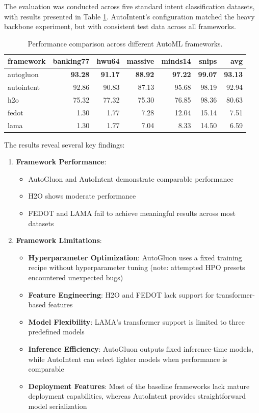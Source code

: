 The evaluation was conducted across five standard intent classification datasets, with results presented in Table \ref{tab:baselines}. AutoIntent's configuration matched the heavy backbone experiment, but with consistent test data across all frameworks.

\begin{table}[h]
\centering
\begin{tabular}{l|rrrrr|r}
\toprule
framework & banking77 & hwu64 & massive & minds14 & snips & avg \\
\midrule
autogluon & \textbf{93.28} & \textbf{91.17} & \textbf{88.92} & \textbf{97.22} & \textbf{99.07} & \textbf{93.13} \\
autointent & 92.86 & 90.83 & 87.13 & 95.68 & 98.19 & 92.94 \\
h2o & 75.32 & 77.32 & 75.30 & 76.85 & 98.36 & 80.63 \\
fedot & 1.30 & 1.77 & 7.28 & 12.04 & 15.14 & 7.51 \\
lama & 1.30 & 1.77 & 7.04 & 8.33 & 14.50 & 6.59 \\
\bottomrule
\end{tabular}
\caption{Performance comparison across different AutoML frameworks.}
\label{tab:baselines}
\end{table}

The results reveal several key findings:

\begin{enumerate}
    \item \textbf{Framework Performance}:
    \begin{itemize}
        \item AutoGluon and AutoIntent demonstrate comparable performance
        \item H2O shows moderate performance
        \item FEDOT and LAMA fail to achieve meaningful results across most datasets
    \end{itemize}
    
    \item \textbf{Framework Limitations}:
    \begin{itemize}
        \item \textbf{Hyperparameter Optimization}: AutoGluon uses a fixed training recipe without hyperparameter tuning (note: attempted HPO presets encountered unexpected bugs)
        \item \textbf{Feature Engineering}: H2O and FEDOT lack support for transformer-based features
        \item \textbf{Model Flexibility}: LAMA's transformer support is limited to three predefined models
        \item \textbf{Inference Efficiency}: AutoGluon outputs fixed inference-time models, while AutoIntent can select lighter models when performance is comparable
        \item \textbf{Deployment Features}: Most of the baseline frameworks lack mature deployment capabilities, whereas AutoIntent provides straightforward model serialization
    \end{itemize}
\end{enumerate}

